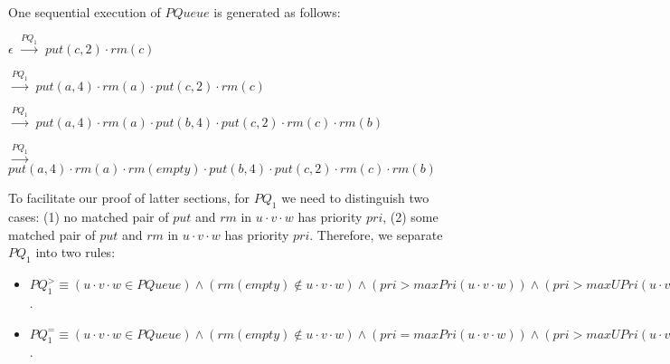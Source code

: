 \begin{example}\label{example:generate priority queue executions}
One sequential execution of $\textit{PQueue}$ is generated as follows:

$\epsilon$ $\xrightarrow{\textit{PQ}_1}$ $\textit{put}(c,2) \cdot \textit{rm}(c)$

$\xrightarrow{\textit{PQ}_1}$ $\textit{put}(a,4) \cdot \textit{rm}(a) \cdot \textit{put}(c,2) \cdot \textit{rm}(c)$

$\xrightarrow{\textit{PQ}_1}$ $\textit{put}(a,4) \cdot \textit{rm}(a) \cdot \textit{put}(b,4) \cdot \textit{put}(c,2) \cdot \textit{rm}(c) \cdot \textit{rm}(b)$

$\xrightarrow{\textit{PQ}_1}$ $\textit{put}(a,4) \cdot \textit{rm}(a) \cdot \textit{rm}(\textit{empty}) \cdot \textit{put}(b,4) \cdot \textit{put}(c,2) \cdot \textit{rm}(c) \cdot \textit{rm}(b)$
\end{example}

To facilitate our proof of latter sections, for $\textit{PQ}_1$ we need to distinguish two cases: (1) no matched pair of $\textit{put}$ and $\textit{rm}$ in $u \cdot v \cdot w$ has priority $\textit{pri}$, (2) some matched pair of $\textit{put}$ and $\textit{rm}$ in $u \cdot v \cdot w$ has priority $\textit{pri}$.  Therefore, we separate $\textit{PQ}_1$ into two rules:

\begin{itemize}
\setlength{\itemsep}{0.5pt}
\item[-] $\textit{PQ}_1^{>} \equiv (u \cdot v \cdot w \in \textit{PQueue}) \wedge (\textit{rm}(\textit{empty}) \notin u \cdot v \cdot w) \wedge (\textit{pri} > \textit{maxPri}(u \cdot v \cdot w)) \wedge (\textit{pri} > \textit{maxUPri}(u \cdot v \cdot w)) \wedge (\textit{matched}(u \cdot v) ) \Rightarrow (u \cdot \textit{put}(\textit{itm},\textit{pri}) \cdot v \cdot \textit{rm}(\textit{itm}) \cdot w \in \textit{PQueue})$.

\item[-] $\textit{PQ}_1^{=} \equiv (u \cdot v \cdot w \in \textit{PQueue}) \wedge (\textit{rm}(\textit{empty}) \notin u \cdot v \cdot w) \wedge (\textit{pri} = \textit{maxPri}(u \cdot v \cdot w)) \wedge (\textit{pri} > \textit{maxUPri}(u \cdot v \cdot w)) \wedge (\textit{matched}(u \cdot v) ) \wedge (\textit{putInSeq}(u \cdot v \cdot w,u,\textit{pri})) \Rightarrow (u \cdot \textit{put}(\textit{itm},\textit{pri}) \cdot v \cdot \textit{rm}(\textit{itm}) \cdot w \in \textit{PQueue})$.
\end{itemize}


